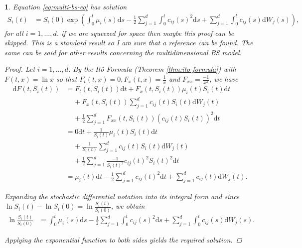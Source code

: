 \documentclass[english]{article}
\newcommand{\comment}[1]{\color{blue}#1\color{black}}
\numberwithin{equation}{section}
\numberwithin{figure}{section}
\theoremstyle{bolddescit}
\newtheorem{theorem}{\protect\theoremname}[section]
\theoremstyle{definition}
\theoremstyle{definition}
\theoremstyle{plain}
\theoremstyle{plain}
\theoremstyle{bolddesc}
\theoremstyle{plain}
\theoremstyle{remark}
\providecommand{\theoremname}{Theorem}
\begin{document}
\begin{theorem}\label{thm:bs-solution}
  Equation \eqref{eq:multi-bs-eq} has solution
  \begin{align*}
    S_i(t) &= S_i(0) \exp \left( \int_0^t \mu_i(s) \mathrm{d}s - \frac{1}{2} \sum_{j=1}^{d} \int_0^t c_{ij}(s)^2 \mathrm{d}s + \sum_{j=1}^d \int_0^t c_{ij}(s) \mathrm{d}W_j(s) \right),
  \end{align*}
  for all $i=1,\ldots,d$.
\comment{if we are squeezed for space then maybe this proof can be skipped. This is a standard result so I am sure that a reference can be found. The same can be said for other results concerning the multidimensional BS model.}

  \begin{proof}
    Let $i = 1,\ldots,d$. By the It\^o Formula (Theorem \ref{thm:ito-formula}) with $F(t,x) = \ln x$ so that $F_t(t,x) = 0, F_x(t,x) = \frac{1}{x}$ and $F_{xx} = \frac{-1}{x^2}$, we have
    \begin{align*}
      \mathrm{d}F(t,S_i(t))
      &= F_t(t,S_i(t)) \mathrm{d}t + F_x(t,S_i(t)) \mu_i(t) S_i(t) \mathrm{d}t\\
      &\ \ \ \ \ + F_x(t,S_i(t)) \sum_{j=1}^d c_{ij}(t) S_i(t) \mathrm{d}W_j(t)\\
      &\ \ \ \ \ + \frac{1}{2} \sum_{j=1}^d F_{xx}(t,S_i(t)) (c_{ij}(t) S_i(t))^2 \mathrm{d}t\\
      &= 0 \mathrm{d}t + \frac{1}{S_i(t)} \mu_i(t) S_i(t) \mathrm{d}t\\
      &\ \ \ \ \ + \frac{1}{S_i(t)} \sum_{j=1}^d c_{ij}(t) S_i(t) \mathrm{d}W_j(t)\\
      &\ \ \ \ \ + \frac{1}{2} \sum_{j=1}^d \frac{-1}{S_i(t)^2} c_{ij}(t)^2 S_i(t)^2 \mathrm{d}t\\
      &= \mu_i(t) \mathrm{d}t
      - \frac{1}{2} \sum_{j=1}^d c_{ij}(t)^2 \mathrm{d}t
      + \sum_{j=1}^d c_{ij}(t) \mathrm{d}W_j(t).
    \end{align*}

    Expanding the stochastic differential notation into its integral form and since $\ln S_i(t) - \ln S_i(0) = \ln \frac{S_i(t)}{S_i(0)}$, we obtain
    \begin{align*}
      \ln \frac{S_i(t)}{S_i(0)}
      &= \int_0^t \mu_i(s) \mathrm{d}s
      - \frac{1}{2} \sum_{j=1}^d \int_0^t c_{ij}(s)^2 \mathrm{d}s
      + \sum_{j=1}^d \int_0^t c_{ij}(s) \mathrm{d}W_j(s).
    \end{align*}

    Applying the exponential function to both sides yields the required solution.
  \end{proof}
\end{theorem}
\end{document}
